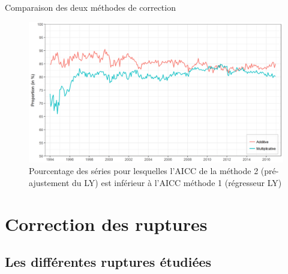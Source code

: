 \documentclass[10pt,xcolor=table,color={dvipsnames,usenames},ignorenonframetext,usepdftitle=false,french]{beamer}
\begin{document}
\begin{frame}{Comparaison des deux méthodes de correction}

\begin{figure}
\centering
\includegraphics[width = \textwidth]{img/LYaicc.png}
\caption{Pourcentage des séries pour lesquelles l'AICC de la méthode 2 (pré-ajustement du LY) est inférieur à l'AICC méthode 1 (régresseur LY)}
\end{figure}

\end{frame}

\section{Correction des ruptures}\label{correction-des-ruptures}

\subsection{Les différentes ruptures
étudiées}\label{les-differentes-ruptures-etudiees}
\end{document}

